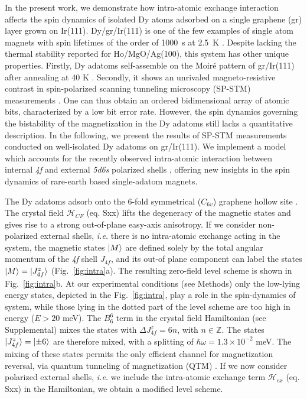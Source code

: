 \documentclass[
reprint,amsmath,amssymb,aps]{revtex4-2}
\begin{document}
In the present work, we demonstrate how intra-atomic exchange interaction affects the spin dynamics of isolated Dy atoms adsorbed on a single graphene (gr) layer grown on Ir(111). Dy/gr/Ir(111) is one of the few examples of single atom magnets \cite{Natterer2018,kiralyOrbitallyDerivedSingleatom2018} with spin lifetimes of the order of 1000~s at 2.5~K \cite{baltic2016}. Despite lacking the thermal stability reported for Ho/MgO/Ag(100), this system has other unique properties. Firstly, Dy adatoms self-assemble on the Moiré pattern of gr/Ir(111) after annealing at 40 K \cite{pivettaDirectCaptureElectrostatic2018}. Secondly, it shows an unrivaled magneto-resistive contrast in spin-polarized scanning tunneling microscopy (SP-STM) measurements \cite{pivettaMeasuringIntraAtomicExchange2020}. One can thus obtain an ordered bidimensional array of atomic bits, characterized by a low bit error rate.
However, the spin dynamics governing the bistability of the magnetization in the Dy adatoms still lacks a quantitative  description.
In the following, we present the results of SP-STM  measurements conducted  on  well-isolated  Dy  adatoms on gr/Ir(111). We implement a model which accounts for the  recently  observed  intra-atomic  interaction  between internal \textit{4f} and  external \textit{5d6s} polarized  shells  \cite{pivettaMeasuringIntraAtomicExchange2020}, offering new insights in the spin dynamics  of  rare-earth  based  single-adatom  magnets.

The Dy adatoms adsorb onto the 6-fold symmetrical ($C_{6v}$) graphene hollow site \cite{baltic2018}. The crystal field  $\mathcal{H}_{CF}$ (eq. Sxx) lifts the degeneracy of the magnetic states and gives rise to a strong out-of-plane easy-axis anisotropy.
If we consider non-polarized external shells, \textit{i.e.} there is no intra-atomic exchange acting in the system,
the magnetic states $\ket{M}$ are defined solely by the total angular momentum of the \textit{4f} shell $J_{4f}$, and its out-of plane component can label the states $\ket{M}=\ket{J^{z}_{4f}}$ (Fig.~\ref{fig:intra}a). The resulting zero-field level scheme is shown in Fig.~\ref{fig:intra}b. At our experimental conditions (see Methods) only the low-lying energy states, depicted in the Fig.~\ref{fig:intra}, play a role in the spin-dynamics of system, while those lying in the dotted part of the level scheme are too high in energy ($E>20$ meV). The $B_6^6$ term in the crystal field Hamiltonian (see Supplemental) mixes the states with $\Delta J^{z}_{4f}=6n$, with $n\in \mathbb{Z}$. The states $\ket{J^{z}_{4f}}=\ket{\pm 6}$ are therefore mixed, with a splitting of $\hbar\omega=1.3 \times 10^{-2}$ meV. The mixing of these states permits the only efficient channel for magnetization reversal, via quantum tunneling of magnetization (QTM) \citep{baltic2016}.
If we now consider polarized external shells, \textit{i.e.} we include the intra-atomic exchange term $\mathcal{H}_{ex}$ (eq. Sxx) in the Hamiltonian, we obtain a modified level scheme.
\end{document}
